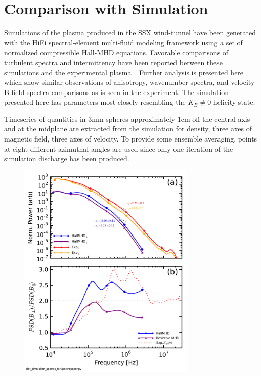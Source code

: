 \documentclass[aip,prl,amsmath,amssymb,reprint,superscriptaddress]{revtex4-1} %
\begin{document}
\section{Comparison with Simulation}\label{sec:simulation}

Simulations of the plasma produced in the SSX wind-tunnel have been generated with the HiFi spectral-element multi-fluid modeling framework using a set of normalized compressible Hall-MHD equations. Favorable comparisons of turbulent spectra and intermittency have been reported between these simulations and the experimental plasma~\cite{schaffner14a}. Further analysis is presented here which show similar observations of anisotropy, wavenumber spectra, and velocity-B-field spectra comparisons as is seen in the experiment. The simulation presented here has parameters most closely resembling the $K_{B}\neq 0$ helicity state.

Timeseries of quantities in 3mm spheres approximately 1cm off the central axis and at the midplane are extracted from the simulation for density, three axes of magnetic field, three axes of velocity. To provide some ensemble averaging, points at eight different azimuthal angles are used since only one iteration of the simulation discharge has been produced.

\begin{figure}[!htbp]
\centerline{
\includegraphics[width=8.5cm]{Anisotropy_simulation_comparison}}
\caption{\label{fig:aniso_comp}}
\end{figure}
\end{document}

